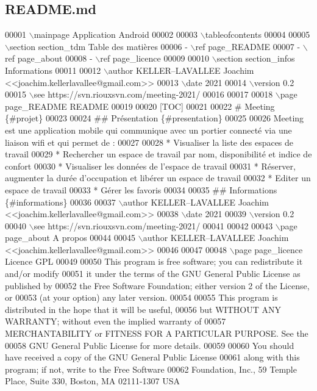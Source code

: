 \hypertarget{_r_e_a_d_m_e_8md_source}{}\subsection{R\+E\+A\+D\+M\+E.\+md}

\begin{DoxyCode}
00001 \(\backslash\)mainpage Application Android
00002 
00003 \(\backslash\)tableofcontents
00004 
00005 \(\backslash\)section section\_tdm Table des matières
00006 - \(\backslash\)ref page\_README
00007 - \(\backslash\)ref page\_about
00008 - \(\backslash\)ref page\_licence
00009 
00010 \(\backslash\)section section\_infos Informations
00011 
00012 \(\backslash\)author KELLER--LAVALLEE Joachim <<joachim.kellerlavallee@gmail.com>>
00013 \(\backslash\)date 2021
00014 \(\backslash\)version 0.2
00015 \(\backslash\)see https://svn.riouxsvn.com/meeting-2021/
00016 
00017 
00018 \(\backslash\)page page\_README README
00019 
00020 [TOC]
00021 
00022 # Meeting \{#projet\}
00023 
00024 ## Présentation \{#presentation\}
00025 
00026 Meeting est une application mobile qui communique avec un portier connecté via une liaison wifi et qui
       permet de :
00027 
00028 * Visualiser la liste des espaces de travail
00029 * Rechercher un espace de travail par nom, disponibilité et indice de confort
00030 * Visualiser les données de l'espace de travail
00031 * Réserver, augmenter la durée d'occupation et libérer un espace de travail
00032 * Editer un espace de travail
00033 * Gérer les favoris
00034 
00035 ## Informations \{#informations\}
00036 
00037 \(\backslash\)author KELLER--LAVALLEE Joachim <<joachim.kellerlavallee@gmail.com>>
00038 \(\backslash\)date 2021
00039 \(\backslash\)version 0.2
00040 \(\backslash\)see https://svn.riouxsvn.com/meeting-2021/
00041 
00042 
00043 \(\backslash\)page page\_about A propos
00044 
00045 \(\backslash\)author KELLER--LAVALLEE Joachim <<joachim.kellerlavallee@gmail.com>>
00046 
00047 
00048 \(\backslash\)page page\_licence Licence GPL
00049 
00050 This program is free software; you can redistribute it and/or modify
00051 it under the terms of the GNU General Public License as published by
00052 the Free Software Foundation; either version 2 of the License, or
00053 (at your option) any later version.
00054 
00055 This program is distributed in the hope that it will be useful,
00056 but WITHOUT ANY WARRANTY; without even the implied warranty of
00057 MERCHANTABILITY or FITNESS FOR A PARTICULAR PURPOSE. See the
00058 GNU General Public License for more details.
00059 
00060 You should have received a copy of the GNU General Public License
00061 along with this program; if not, write to the Free Software
00062 Foundation, Inc., 59 Temple Place, Suite 330, Boston, MA 02111-1307 USA
\end{DoxyCode}
